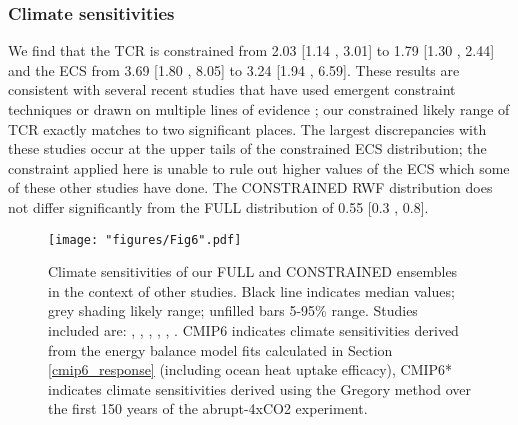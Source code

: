 \documentclass[gmd, manuscript]{copernicus}
\begin{document}
\subsubsection{Climate sensitivities}
We find that the TCR is constrained from 2.03 [1.14 , 3.01] to 1.79 [1.30 , 2.44] and the ECS from 3.69 [1.80 , 8.05] to 3.24 [1.94 , 6.59]. These results are consistent with several recent studies that have used emergent constraint techniques \citep[Figure \ref{fig:clim_sens_comp}]{Nijsse2020,Jimenez-de-la-Cuesta2019,Tokarska2020a,Brunner2020,Ribes2021} or drawn on multiple lines of evidence \citep{Sherwood2020}; our constrained likely range of TCR exactly matches \citeauthor{Sherwood2020} to two significant places. The largest discrepancies with these studies occur at the upper tails of the constrained ECS distribution; the constraint applied here is unable to rule out higher values of the ECS which some of these other studies have done. The CONSTRAINED RWF distribution does not differ significantly from the FULL distribution of 0.55 [0.3 , 0.8].
%
\clearpage
\begin{figure}[t]
    \texttt{[image: "figures/Fig6".pdf]}
    \caption{Climate sensitivities of our FULL and CONSTRAINED ensembles in the context of other studies. Black line indicates median values; grey shading likely range; unfilled bars 5-95\% range. Studies included are: \citet[B20]{Brunner2020}, \citet[C19]{Jimenez-de-la-Cuesta2019}, \citet[N20]{Nijsse2020}, \citet[R21]{Ribes2021}, \citet[S20]{Sherwood2020}, \citet[T20]{Tokarska2020a}. CMIP6 indicates climate sensitivities derived from the energy balance model fits calculated in Section \ref{cmip6_response} (including ocean heat uptake efficacy), CMIP6* indicates climate sensitivities derived using the Gregory method \citep{Gregory2004} over the first 150 years of the abrupt-4xCO2 experiment.}
    \label{fig:clim_sens_comp}
\end{figure}
\clearpage
\end{document}
